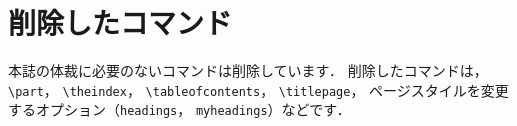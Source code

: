 \documentclass[paper]{ieicej}
\begin{document}
%
%

\section{削除したコマンド}

本誌の体裁に必要のないコマンドは削除しています．
削除したコマンドは，\verb/\part/，\allowbreak
\verb/\theindex/，\allowbreak
\verb/\tableofcontents/，\allowbreak
\verb/\titlepage/，\allowbreak
ページスタイルを変更するオプション（\texttt{headings}，
\texttt{myheadings}）などです．
\end{document}
